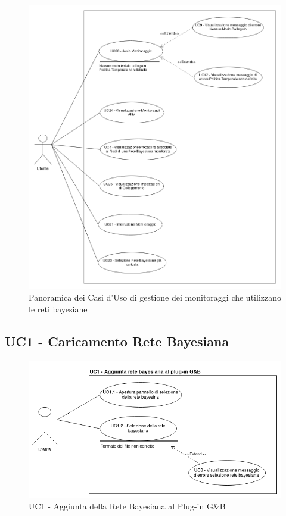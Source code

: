 \begin{figure}[H]
	\begin{center}
		\includegraphics[scale=0.4]{./images/VistaUC2.png}
		 \caption{Panoramica dei Casi d'Uso di gestione dei monitoraggi che utilizzano le reti bayesiane}
		 \label{Panoramica UC Monitoraggio}
	\end{center}
\end{figure}

\pagebreak

\pagebreak
\subsection{UC1 - Caricamento Rete Bayesiana}\label{UC1}
\begin{figure}[H]
	\begin{center}
		\includegraphics[scale=0.5]{./images/UC1.png}
		 \caption{UC1 - Aggiunta della Rete Bayesiana al Plug-in G\&B}
	\end{center}
\end{figure}

